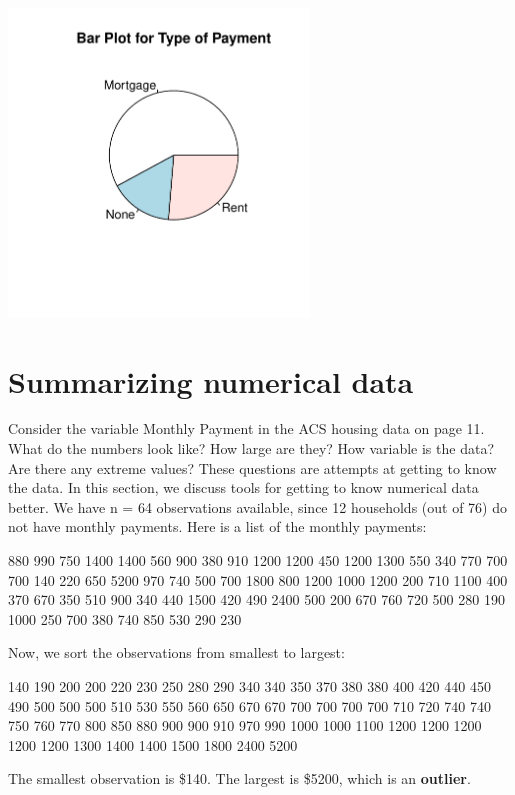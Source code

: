 \documentclass[11pt, chapterprefix=true]{scrbook}\usepackage[]{graphicx}\usepackage[]{color}
\begin{document}
{\centering \includegraphics[width=8cm]{figure/LBL2c-1} 

}




\section{Summarizing numerical data}

Consider the variable Monthly Payment in the ACS housing data on page 11.  What do the numbers look like?  How large are they? How variable is the data?  Are there any extreme values? These questions are attempts at getting to know the data.  In this section, we discuss tools for getting to know numerical data better.  We have n = 64 observations available, since 12 households (out of 76) do not have monthly payments.  Here is a list of the monthly payments:

{\small{
880  990  750 1400 1400  560  900  380  910 1200 1200  450 1200 1300  550 340  770  700  700  140  220  650 5200  970  740  500  700 1800  800 1200  1000 1200  200  710 1100  400  370  670  350  510  900  340  440 1500  420    490 2400  500  200  670  760  720  500  280  190 1000  250  700  380  740  850  530  290  230 }}


Now, we sort the observations from smallest to largest:

{\small{
140  190  200  200  220  230  250  280  290  340  340  350  370  380  380  400  420  440  450  490  500  500  500  510  530  550  560  650  670  670  700  700  700  700  710  720  740  740  750  760  770  800  850  880  900   900  910  970  990 1000 1000 1100 1200 1200 1200 1200 1200 1300 1400 1400  1500 1800 2400 5200 }}

The smallest observation is \$140.  The largest is \$5200, which is an \textbf{outlier}.
\end{document}
